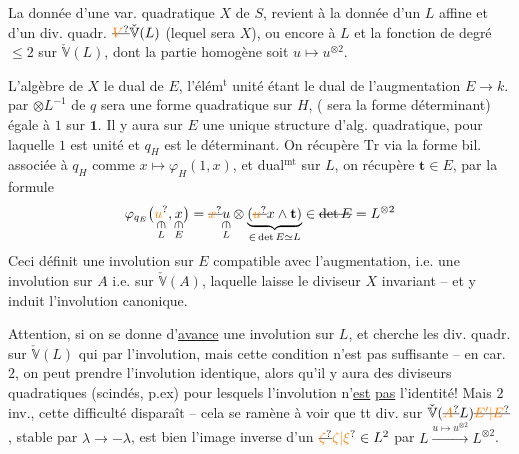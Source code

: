 La  donnée d'une var. quadratique
$X$ de $S$, revient à la donnée d'un
 $L$ affine et d'un div. quadr.  $\deleted{\unsure{V}}\check{\mathbb V}(L)$
(lequel sera $X$), ou encore à $L$ et
la fonction de degré $\leq 2$ sur $\check{\mathbb V}(L)$,
dont la partie homogène soit $u\mapsto u^{\otimes2}$.

L'algèbre de $X$  le dual  de $E$,
l'élém$^{\mathrm t}$ unité étant le dual de l'augmentation $E\to k$.  
par $\otimes L^{-1}$ de $q$ sera une forme
quadratique sur $H$, ( sera la forme
déterminant) égale à $1$ sur $\mathbf{1}$. Il
y aura sur $E$ une unique structure
 d'alg. quadratique, pour
laquelle $1$ est unité et $q_H$ est le
déterminant. On récupère $\mathrm{Tr}$
 via la forme bil. associée à $q_H$
comme $x\mapsto\varphi_H(1,x)$, et dual$^{\mathrm{mt}}$ sur
$L$, on récupère $\mathbf{t}\in E$,  par
la formule
\[
\varphi_{q_E}\bigl(\underset{\substack{\rotatebox{-90}{$\in$}\\L}}{\unsure{u}},\underset{\substack{\rotatebox{-90}{$\in$}\\E}}{x}\bigr)
=\deleted{\unsure{x}}\underset{\substack{\rotatebox{-90}{$\in$}\\L}}{u}\otimes
\underbrace{(\deleted{\unsure{u}}x\wedge\mathbf{t})}_{\in\,\det E\simeq L}\in\deleted{\det E}=L^{\otimes 2}
\]
Ceci  définit une involution sur
$E$ compatible avec l'augmentation, i.e.
une involution sur $A$ i.e. sur $\check{\mathbb V}(A)$,
laquelle laisse le diviseur $X$ invariant --
et y induit l'involution canonique.

Attention, si on se donne d'\uline{avance}
une involution sur $L$, et cherche les
div. quadr. sur $\check{\mathbb V}(L)$ qui  
 par l'involution, 
mais cette condition n'est pas suffisante
-- en car. $2$, on peut prendre l'involution
identique, alors qu'il y aura des
diviseurs quadratiques (scindés, p.ex)
pour lesquels l'involution n'\uline{est} \uline{pas}
l'identité! Mais  $2$ inv., cette difficulté
disparaît -- cela se ramène à voir
que tt div. sur $\check{\mathbb V}(\deleted{\unsure{A}}L)\deleted{\unsure{E'|E}}$, stable
par $\lambda\to-\lambda$, est bien l'image inverse
d'un $\deleted{\unsure{\zeta}}\unsure{\zeta|\xi}\in L^2$ par $L\xrightarrow{u\mapsto u^{\otimes 2}} L^{\otimes 2}$.

